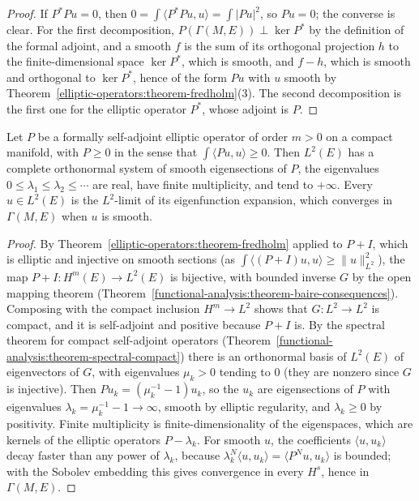 \begin{proof}
If $P^*Pu = 0$, then $0 = \int\langle P^*Pu, u\rangle = \int|Pu|^2$, so $Pu = 0$; the converse is clear. For the first decomposition, $P(\Gamma(M, E)) \perp \ker P^*$ by the definition of the formal adjoint, and a
smooth $f$ is the sum of its orthogonal projection $h$ to the finite-dimensional space $\ker P^*$, which is smooth, and $f - h$, which is smooth and orthogonal to $\ker P^*$, hence of the form $Pu$ with $u$ smooth
by Theorem~\ref{elliptic-operators:theorem-fredholm}(3). The second decomposition is the first one for the elliptic operator $P^*$, whose adjoint is $P$.
\end{proof}

\begin{theorem}\label{elliptic-operators:theorem-spectral}
Let $P$ be a formally self-adjoint elliptic operator of order $m > 0$ on a compact manifold, with $P \geq 0$ in the sense that $\int\langle Pu, u\rangle \geq 0$. Then $L^2(E)$ has a complete orthonormal
system of smooth eigensections of $P$, the eigenvalues $0 \leq \lambda_1 \leq \lambda_2 \leq \cdots$ are real, have finite multiplicity, and tend to $+\infty$. Every $u \in L^2(E)$ is the $L^2$-limit of its
eigenfunction expansion, which converges in $\Gamma(M, E)$ when $u$ is smooth.
\end{theorem}

\begin{proof}
By Theorem~\ref{elliptic-operators:theorem-fredholm} applied to $P + I$, which is elliptic and injective on smooth sections (as $\int\langle (P+I)u, u\rangle \geq \|u\|_{L^2}^2$), the map
$P + I \colon H^m(E) \to L^2(E)$ is bijective, with bounded inverse $G$ by the open mapping theorem (Theorem~\ref{functional-analysis:theorem-baire-consequences}). Composing with the compact inclusion
$H^m \to L^2$ shows that $G \colon L^2 \to L^2$ is compact, and it is self-adjoint and positive because $P + I$ is. By the spectral theorem for compact self-adjoint operators
(Theorem~\ref{functional-analysis:theorem-spectral-compact}) there is an orthonormal basis of $L^2(E)$ of eigenvectors of $G$, with eigenvalues $\mu_k > 0$ tending to $0$ (they are nonzero since $G$ is
injective). Then $Pu_k = (\mu_k^{-1} - 1)u_k$, so the $u_k$ are eigensections of $P$ with eigenvalues $\lambda_k = \mu_k^{-1} - 1 \to \infty$, smooth by elliptic regularity, and $\lambda_k \geq 0$ by positivity.
Finite multiplicity is finite-dimensionality of the eigenspaces, which are kernels of the elliptic operators $P - \lambda_k$. For smooth $u$, the coefficients $\langle u, u_k\rangle$ decay faster than any power
of $\lambda_k$, because $\lambda_k^N\langle u, u_k\rangle = \langle P^Nu, u_k\rangle$ is bounded; with the Sobolev embedding this gives convergence in every $H^s$, hence in $\Gamma(M, E)$.
\end{proof}

